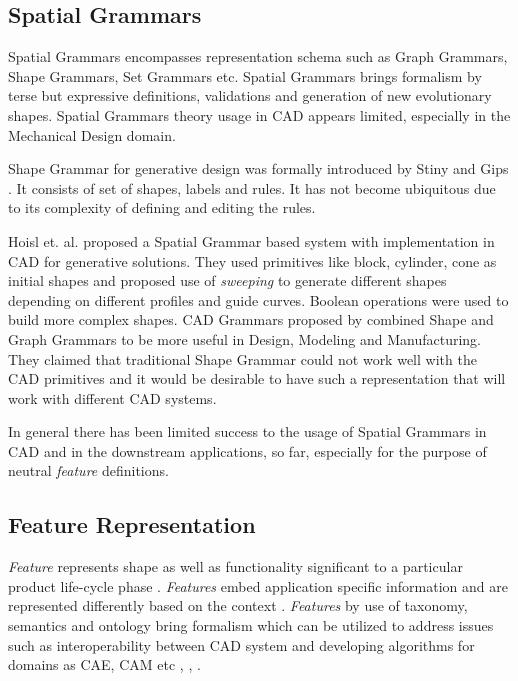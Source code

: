 \subsection{Spatial Grammars}

Spatial Grammars encompasses representation schema such as Graph Grammars, Shape Grammars, Set Grammars etc. Spatial Grammars brings formalism by terse but expressive definitions, validations and generation of new evolutionary shapes.  Spatial Grammars theory usage in CAD appears limited, especially in the Mechanical Design domain.

Shape Grammar for generative design was formally introduced by Stiny and Gips \cite{Stiny1971}. It consists of set of shapes, labels and rules. It has not become ubiquitous due to its complexity of defining and editing the rules.

Hoisl et. al.\cite{Hoisl2009}  proposed a Spatial Grammar based system with implementation in CAD for generative solutions. They used primitives like block, cylinder, cone as initial shapes and proposed use of {\em sweeping} to generate different shapes depending on different profiles and guide curves. Boolean operations were used to build more complex shapes. CAD Grammars proposed by \cite{Deak2006} combined Shape and Graph Grammars to be more useful in Design, Modeling and Manufacturing. They claimed that traditional Shape Grammar could not work well with the CAD primitives and it would be desirable to have such a representation that will work with different CAD systems.

In general there has been limited success to the usage of Spatial Grammars in CAD and in the downstream applications, so far, especially for the purpose of neutral {\em feature} definitions.

\subsection{Feature Representation}
{\em Feature} represents shape as well as functionality significant to a particular product life-cycle phase \cite{Berg2002}. {\em Features} embed application specific information and are represented differently based on the context \cite{mandorli1996}. {\em Features} by use of taxonomy, semantics and ontology  bring formalism which can be utilized to address issues such as interoperability between CAD system and developing algorithms for domains as CAE, CAM etc \cite{BidarraBronsvoort2000}, \cite{Tessier2011}, \cite{Ma2013}.

